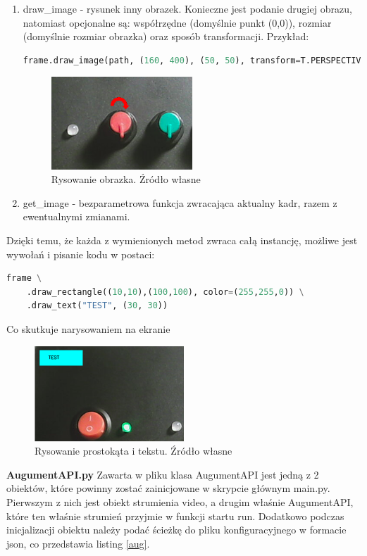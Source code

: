 \documentclass[12pt,twoside,polish]{article}
\begin{document}
\begin{enumerate}[label=\alph*), leftmargin=1.25cm]
\item draw\_image - rysunek inny obrazek. Konieczne jest podanie drugiej obrazu, natomiast opcjonalne są: współrzędne (domyślnie punkt (0,0)), rozmiar (domyślnie rozmiar obrazka) oraz sposób transformacji. Przykład:
\begin{lstlisting}[language=Python]
frame.draw_image(path, (160, 400), (50, 50), transform=T.PERSPECTIVE)
\end{lstlisting}
\begin{figure}[h]
	\centering
	\includegraphics[width=0.5\textwidth]{draw_img}
	\caption {Rysowanie obrazka. Źródło własne}
\end{figure}

\item get\_image - bezparametrowa funkcja zwracająca aktualny kadr, razem z ewentualnymi zmianami.
\end{enumerate}

Dzięki temu, że każda z wymienionych metod zwraca całą instancję, możliwe jest wywołań i pisanie kodu w postaci:
\begin{lstlisting}[language=Python]
frame \
	.draw_rectangle((10,10),(100,100), color=(255,255,0)) \
	.draw_text("TEST", (30, 30))
\end{lstlisting}
Co skutkuje narysowaniem na ekranie
\begin{figure}[h]
	\centering
	\includegraphics[width=0.5\textwidth]{chaining}
	\caption{Rysowanie prostokąta i tekstu. Źródło własne}
\end{figure}


\textbf{AugumentAPI.py}
Zawarta w pliku klasa AugumentAPI jest jedną z 2 obiektów, które powinny zostać zainicjowane w skrypcie głównym main.py. Pierwszym z nich jest obiekt strumienia video, a drugim właśnie AugumentAPI, które ten właśnie strumień przyjmie w funkcji startu run. Dodatkowo podczas inicjalizacji obiektu należy podać ścieżkę do pliku konfiguracyjnego w formacie json, co przedstawia listing \ref{aug}.
\end{document}
